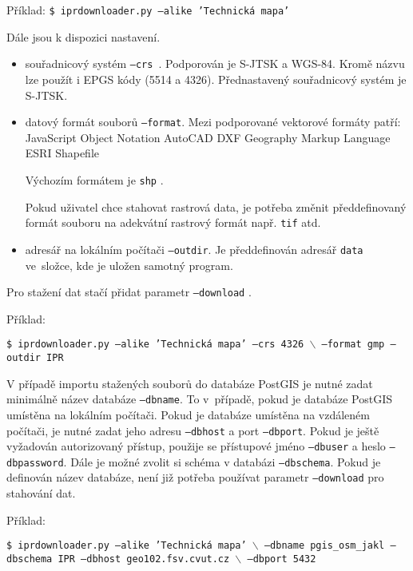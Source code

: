 Příklad: {\tt \$ iprdownloader.py ---alike 'Technická mapa'}

Dále jsou k dispozici nastavení.
\begin{itemize}
    \item souřadnicový systém {\tt ---crs }. Podporován je S-JTSK a WGS-84. Kromě názvu lze použít i EPGS kódy (5514 a 4326). Přednastavený souřadnicový systém je S-JTSK.

    \item datový formát souborů {\tt ---format}.
    Mezi podporované vektorové formáty patří:
          JavaScript Object Notation
          AutoCAD DXF
          Geography Markup Language
          ESRI Shapefile
        
        Výchozím formátem je {\tt shp} .
         
    Pokud uživatel chce stahovat rastrová data, je potřeba změnit
    předdefinovaný formát souboru na adekvátní rastrový formát např.
    {\tt tif} atd.
    
    \item adresář na lokálním počítači {\tt ---outdir}. Je předdefinován
    adresář {\tt data} ve~složce, kde je uložen samotný program.

\end{itemize}

Pro stažení dat stačí přidat parametr {\tt ---download} .

Příklad:

{\tt \$ iprdownloader.py ---alike 'Technická mapa' ---crs 4326 $\backslash$ \newline ---format gmp ---outdir IPR}

V případě importu stažených souborů do databáze PostGIS je nutné zadat minimálně název databáze {\tt ---dbname}.
To v~případě, pokud je databáze PostGIS umístěna na lokálním počítači. Pokud
je databáze umístěna na vzdáleném počítači, je nutné zadat jeho adresu
{\tt ---dbhost} a port {\tt ---dbport}. Pokud je ještě vyžadován
autorizovaný přístup, použije se přístupové jméno {\tt ---dbuser} a
heslo {\tt ---dbpassword}. Dále je možné zvolit si schéma v databázi
{\tt ---dbschema}. Pokud je definován název databáze, není již potřeba
používat parametr {\tt ---download} pro stahování dat.

Příklad:

{\tt \$ iprdownloader.py ---alike 'Technická mapa' $\backslash$ \newline ---dbname pgis\_osm\_jakl ---dbschema IPR ---dbhost geo102.fsv.cvut.cz  $\backslash$ \newline ---dbport 5432 } 
 

